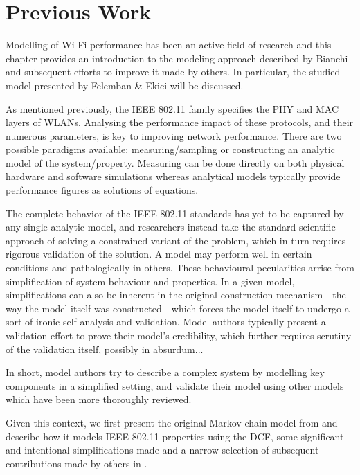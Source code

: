 
\chapter{Previous Work}

Modelling of Wi-Fi performance has been an active field of research and this
chapter provides an introduction to the modeling approach described by Bianchi
\cite{bianchi} and subsequent efforts to improve it made by others. In
particular, the studied model presented by Felemban \& Ekici \cite{felemban}
will be discussed.

As mentioned previously, the IEEE 802.11 family specifies the PHY and MAC
layers of WLANs. Analysing the performance impact of these protocols, and
their numerous parameters, is key to improving network performance. There are
two possible paradigms available: measuring/sampling or constructing an
analytic model of the system/property. Measuring can be done directly on both
physical hardware and software simulations whereas analytical models typically
provide performance figures as solutions of equations.

The complete behavior of the IEEE 802.11 standards has yet to be captured by
any single analytic model, and researchers instead take the standard
scientific approach of solving a constrained variant of the problem, which in
turn requires rigorous validation of the solution. A model may perform well in
certain conditions and pathologically in others. These behavioural
pecularities arrise from simplification of system behaviour and properties. In
a given model, simplifications can also be inherent in the original
construction mechanism—the way the model itself was constructed—which forces
the model itself to undergo a sort of ironic self-analysis and validation.
Model authors typically present a validation effort to prove their model's
credibility, which further requires scrutiny of the validation itself,
possibly in absurdum...

In short, model authors try to describe a complex system by modelling key
components in a simplified setting, and validate their model using other
models which have been more thoroughly reviewed.

Given this context, we first present the original Markov chain model from
\cite{bianchi} and describe how it models IEEE 802.11 properties using the
DCF, some significant and intentional simplifications made and a narrow
selection of subsequent contributions made by others in \cite{1019305}\cite{1258379}\cite{1512111}\cite{article}.

